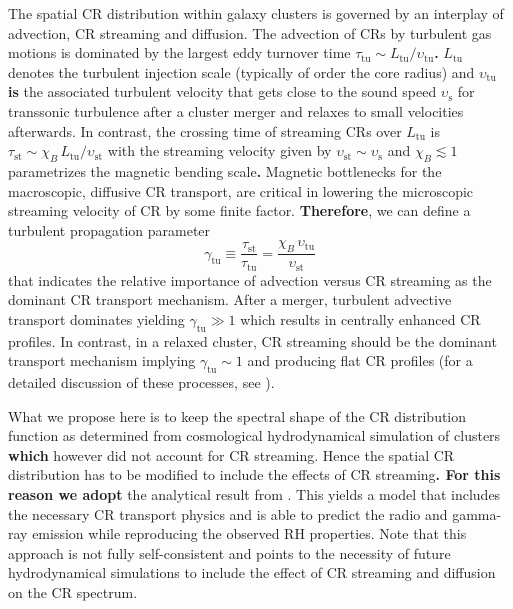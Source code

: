 \documentclass[traditabstract]{aa}
\def\C#1{{\bf #1}}
\newcommand{\rmn}{\mathrm}
\newcommand{\vel}{\upsilon}
\begin{document}
The spatial CR distribution within galaxy clusters is governed by an interplay
of advection, CR streaming and diffusion. The advection of CRs by turbulent gas
motions is dominated by the largest eddy turnover time $\tau_{\rmn{tu}}\sim
L_{\rmn{tu}}/ \vel_{\rmn{tu}}$\C{.} $L_{\rmn{tu}}$ denotes the turbulent
injection scale (typically of order the core radius) and $\vel_{\rmn{tu}}$ \C{is}
the associated turbulent velocity that gets close to the sound speed
$\vel_{\rmn{s}}$ for transsonic turbulence after a cluster merger and relaxes to
small velocities afterwards. In contrast, the crossing time of streaming CRs
over $L_{\rmn{tu}}$ is $\tau_{\rmn{st}}\sim \chi_B\,L_{\rmn{tu}}/
\vel_{\rmn{st}}$ with the streaming velocity given by $\vel_{\rmn{st}}\sim
\vel_{\rmn{s}}$ and $\chi_B\lesssim 1$ parametrizes the magnetic bending scale\C{.}
Magnetic bottlenecks for the macroscopic, diffusive CR transport,
are critical in lowering the microscopic streaming velocity of CR by some
finite factor. \C{Therefore}, we can define a turbulent propagation parameter
\begin{equation}
  \label{eq:gamma_tu}
  \gamma_{\rmn{tu}}\equiv\frac{\tau_{\rmn{st}}}{\tau_{\rmn{tu}}}=
  \frac{\chi_B\,\vel_{\rmn{tu}}}{\vel_{\rmn{st}}}
\end{equation}
that indicates the relative importance of advection versus CR streaming as the
dominant CR transport mechanism. After a merger, turbulent advective transport
dominates yielding $\gamma_{\rmn{tu}}\gg 1$ which results in centrally enhanced
CR profiles. In contrast, in a relaxed cluster, CR streaming should be the
dominant transport mechanism implying $\gamma_{\rmn{tu}}\sim1$ and producing
flat CR profiles (for a detailed discussion of these processes, see
\citealp{2011A&A...527A..99E}).

What we propose here is to keep the spectral shape of the CR distribution
function as determined from cosmological hydrodynamical simulation of clusters
\citep{2010MNRAS.409..449P} \C{which} however did not account for CR streaming. 
Hence the spatial CR distribution has to be modified to include the effects of CR
streaming\C{. For this reason we adopt} the analytical result from
\citet{2011A&A...527A..99E}. This yields a model that includes the necessary CR
transport physics and is able to predict the radio and gamma-ray emission while
reproducing the observed RH properties. Note that this approach is not fully
self-consistent and points to the necessity of future hydrodynamical simulations
to include the effect of CR streaming and diffusion on the CR spectrum.
\end{document}
